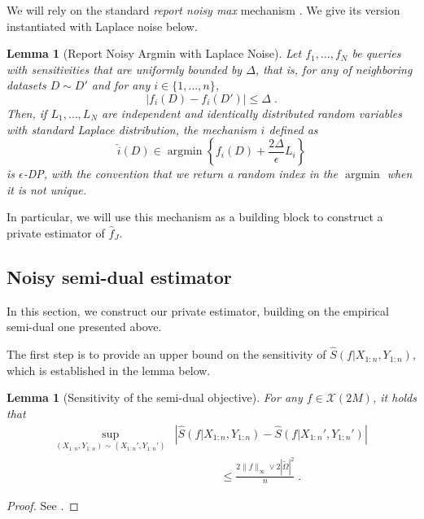 \documentclass{article}
\theoremstyle{plain}
\newtheorem{lemma}[theorem]{Lemma}
\theoremstyle{definition}
\theoremstyle{remark}
\newcommand{\argmin}[0]{\operatorname{argmin}}
\begin{document}
We will rely on the standard \emph{report noisy max} mechanism \cite{dwork2014algorithmic,mcsherry2007mechanism,mckenna2020permuteandflip,ding2021permuteandflip}. 
We give its version instantiated with Laplace noise below.
\begin{lemma}[Report Noisy Argmin with Laplace Noise]
\label{lemma:report_noisy_max}
    Let $f_1, \dots, f_N$ be queries with sensitivities that are uniformly bounded by $\Delta$, that is, for any of neighboring datasets $D \sim D'$ and for any $i \in \{1,\dots,n\}$,
    \begin{equation}
    \label{eq:kjhfkjsbhjdhgfjhqbshdbfbfbfbf}
         |f_i(D) - f_i(D')| \leq \Delta \;.
    \end{equation}
    Then, if $L_1, \dots, L_N$ are independent and identically distributed random variables with standard Laplace distribution, the mechanism $\hat{i}$ defined as
    \begin{equation}
        \hat{i}(D) \in \argmin \left\{ f_i(D) + \frac{2 \Delta}{\epsilon} L_i \right\}
    \end{equation}
    is $\epsilon$-DP,  with the convention that we return a random index in the $\argmin$ when it is not unique.
\end{lemma}
In particular, we will use this mechanism as a building block to construct a private estimator of $\hat{f}_J$.

\subsection{Noisy semi-dual estimator}

In this section, we construct our private estimator, building on the empirical semi-dual one presented above.

The first step is to provide an upper bound on the sensitivity of $\hat{S}(f | X_{1:n}, Y_{1:n})$, which is established in the lemma below.
\begin{lemma}[Sensitivity of the semi-dual objective]
\label{lemma:sensitivitysemidual}
    For any $f\in\mathcal{X}(2M)$, it holds that
    \begin{equation}
    \begin{aligned}
        \sup_{(X_{1:n}, Y_{1:n}) \sim (X_{1:n}', Y_{1:n}')} &\left| \hat{S}(f | X_{1:n}, Y_{1:n}) - \hat{S}(f | X_{1:n}', Y_{1:n}') \right|
         \\
         &\qquad\qquad\leq 
        \frac{2 \| f \|_{\infty} \vee 2 | \tilde{\Omega} |^2}{n} \;.
    \end{aligned}
    \end{equation}
\end{lemma}
\begin{proof}
    See .
\end{proof}
\end{document}
